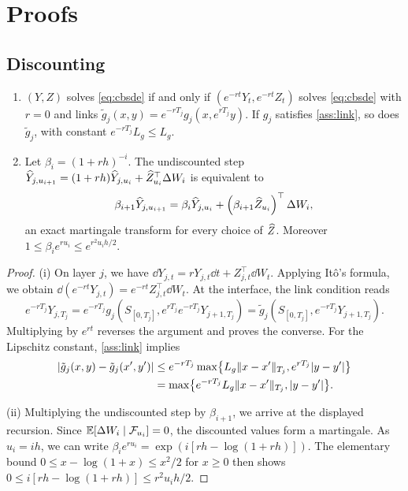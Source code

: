 \FloatBarrier
\section{Proofs}\label{app:proofs}

\subsection{Discounting}\label{app:discount}

\begin{lemma}[discounting]\label{lem:discount}
\leavevmode
\begin{enumerate}[label=(\roman*)]
\item $(Y,Z)$ solves \eqref{eq:cbsde} if and only if $(e^{-rt}Y_t,e^{-rt}Z_t)$ solves \eqref{eq:cbsde} with $r=0$ and links $\tilde g_j(x,y)=e^{-rT_j}g_j(x,e^{rT_j}y)$. If $g_j$ satisfies \cref{ass:link}, so does $\tilde g_j$, with constant $e^{-rT_j}L_g\le L_g$.
\item Let $\beta_i=(1+rh)^{-i}$. The undiscounted step $\widehat Y_{j,u_{i+1}}=(1+rh)\widehat Y_{j,u_i}+\widehat Z_{u_i}^\top\Delta W_i$ is equivalent to
\[
\beta_{i+1}\widehat Y_{j,u_{i+1}}=\beta_i\widehat Y_{j,u_i}+\left(\beta_{i+1}\widehat Z_{u_i}\right)^\top\Delta W_i ,
\]
an exact martingale transform for every choice of $\widehat Z$. Moreover $1\le\beta_ie^{ru_i}\le e^{r^2u_ih/2}$.
\end{enumerate}
\end{lemma}

\begin{proof}
(i) On layer $j$, we have $\dd Y_{j,t}=rY_{j,t}\dd t+Z_{j,t}^\top\dd W_t$. Applying It\^o's formula, we obtain $\dd(e^{-rt}Y_{j,t})=e^{-rt}Z_{j,t}^\top\dd W_t$. At the interface, the link condition reads
\[
e^{-rT_j}Y_{j,T_j}=e^{-rT_j}g_j\left(S_{[0,T_j]},e^{rT_j}e^{-rT_j}Y_{j+1,T_j}\right)=\tilde g_j\left(S_{[0,T_j]},e^{-rT_j}Y_{j+1,T_j}\right).
\]
Multiplying by $e^{rt}$ reverses the argument and proves the converse. For the Lipschitz constant, \cref{ass:link} implies
\begin{align*}
\lvert \tilde g_j(x,y)-\tilde g_j(x',y')\rvert&\le e^{-rT_j}\max\bigl\{L_g\lVert x-x'\rVert_{T_j},e^{rT_j}\lvert y-y'\rvert\bigr\}\\
&=\max\bigl\{e^{-rT_j}L_g\lVert x-x'\rVert_{T_j},\lvert y-y'\rvert\bigr\}.
\end{align*}

(ii) Multiplying the undiscounted step by $\beta_{i+1}$, we arrive at the displayed recursion. Since $\mathbb{E}[\Delta W_i\mid\mathcal{F}_{u_i}]=0$, the discounted values form a martingale. As $u_i=ih$, we can write $\beta_ie^{ru_i}=\exp(i[rh-\log(1+rh)])$. The elementary bound $0\le x-\log(1+x)\le x^2/2$ for $x\ge0$ then shows $0\le i[rh-\log(1+rh)]\le r^2u_ih/2$.
\end{proof}

